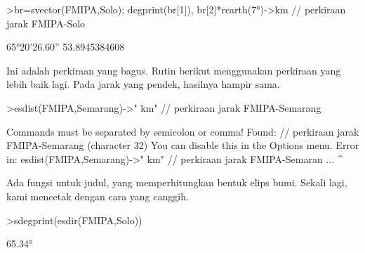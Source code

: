 \documentclass[a4paper,10pt]{article}
\begin{document}
\begin{eulernotebook}
\begin{eulercomment}
\begin{eulercomment}
\begin{eulercomment}
\begin{eulercomment}
\begin{eulercomment}
\begin{eulercomment}
\begin{eulercomment}
\begin{eulercomment}
\begin{eulercomment}
\begin{eulercomment}
\begin{eulercomment}
\begin{eulercomment}
\begin{eulercomment}
\begin{eulercomment}
\begin{eulercomment}
\begin{eulercomment}
\begin{eulercomment}
\begin{eulercomment}
\begin{eulercomment}
\begin{eulercomment}
\begin{eulercomment}
\begin{eulercomment}
\begin{eulercomment}
\begin{eulercomment}
\begin{eulercomment}
\begin{eulercomment}
\begin{eulercomment}
\begin{eulercomment}
\begin{eulercomment}
\begin{eulercomment}
\begin{eulercomment}
\begin{eulercomment}
\begin{eulercomment}
\begin{eulercomment}
\begin{eulercomment}
\begin{eulercomment}
\begin{eulercomment}
\begin{eulercomment}
\begin{eulercomment}
\begin{eulercomment}
\begin{eulercomment}
\begin{eulercomment}
\begin{eulerprompt}
>br=svector(FMIPA,Solo); degprint(br[1]), br[2]*rearth(7°)->km // perkiraan jarak FMIPA-Solo
\end{eulerprompt}
\begin{euleroutput}
  65°20'26.60''
  53.8945384608
\end{euleroutput}
\begin{eulercomment}
Ini adalah perkiraan yang bagus. Rutin berikut menggunakan perkiraan
yang lebih baik lagi. Pada jarak yang pendek, hasilnya hampir sama.
\end{eulercomment}
\begin{eulerprompt}
>esdist(FMIPA,Semarang)->" km" // perkiraan jarak FMIPA-Semarang
\end{eulerprompt}
\begin{euleroutput}
  Commands must be separated by semicolon or comma!
  Found:  // perkiraan jarak FMIPA-Semarang (character 32)
  You can disable this in the Options menu.
  Error in:
  esdist(FMIPA,Semarang)->" km" // perkiraan jarak FMIPA-Semaran ...
                               ^
\end{euleroutput}
\begin{eulercomment}
Ada fungsi untuk judul, yang memperhitungkan bentuk elips bumi. Sekali
lagi, kami mencetak dengan cara yang canggih.
\end{eulercomment}
\begin{eulerprompt}
>sdegprint(esdir(FMIPA,Solo))
\end{eulerprompt}
\begin{euleroutput}
       65.34°
\end{euleroutput}

\end{eulercomment}
\end{eulercomment}
\end{eulercomment}
\end{eulercomment}
\end{eulercomment}
\end{eulercomment}
\end{eulercomment}
\end{eulercomment}
\end{eulercomment}
\end{eulercomment}
\end{eulercomment}
\end{eulercomment}
\end{eulercomment}
\end{eulercomment}
\end{eulercomment}
\end{eulercomment}
\end{eulercomment}
\end{eulercomment}
\end{eulercomment}
\end{eulercomment}
\end{eulercomment}
\end{eulercomment}
\end{eulercomment}
\end{eulercomment}
\end{eulercomment}
\end{eulercomment}
\end{eulercomment}
\end{eulercomment}
\end{eulercomment}
\end{eulercomment}
\end{eulercomment}
\end{eulercomment}
\end{eulercomment}
\end{eulercomment}
\end{eulercomment}
\end{eulercomment}
\end{eulercomment}
\end{eulercomment}
\end{eulercomment}
\end{eulercomment}
\end{eulercomment}
\end{eulercomment}
\end{eulernotebook}
\end{document}
